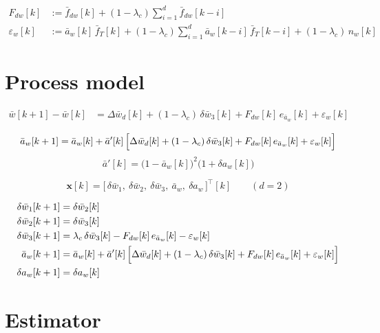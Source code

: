 \documentclass[11pt,a4paper,fontset=none]{ctexart}
\begin{document}
\begin{align*}
F_{dw}[k] &:= \bar{f}_{dw}[k] + (1-\lambda_c)\sum_{i=1}^{d}\bar{f}_{dw}[k-i] \\
\varepsilon_w[k] &:= \bar{a}_w[k]\,\bar{f}_T[k]
  + (1-\lambda_c)\sum_{i=1}^{d}\bar{a}_w[k-i]\,\bar{f}_T[k-i]
  + (1-\lambda_c)\,n_w[k]
\end{align*}

\section{Process model}

\begin{align*}
\bar{w}[k+1] - \bar{w}[k]
  &= \Delta\bar{w}_d[k] + (1-\lambda_c)\,\delta\bar{w}_3[k]
   + F_{dw}[k]\,e_{\bar{a}_w}[k] + \varepsilon_w[k]
\end{align*}

\begin{align*}
\bar{a}_w[k+1] = \bar{a}_w[k] + \bar{a}'[k]\,\Bigl[
  \Delta\bar{w}_d[k] + (1-\lambda_c)\,\delta\bar{w}_3[k]
  + F_{dw}[k]\,e_{\bar{a}_w}[k] + \varepsilon_w[k] \Bigr]
\end{align*}
\begin{equation*}
\bar{a}'[k] = \bigl(1-\bar{a}_w[k]\bigr)^{2}\bigl(1+\delta a_w[k]\bigr)
\end{equation*}

\begin{equation*}
\mathbf{x}[k] = \bigl[\,\delta\bar{w}_1,\ \delta\bar{w}_2,\ \delta\bar{w}_3,\
\bar{a}_w,\ \delta a_w\,\bigr]^{\top}[k] \qquad (d = 2)
\end{equation*}

\begin{align*}
\delta\bar{w}_1[k+1] &= \delta\bar{w}_2[k] \\
\delta\bar{w}_2[k+1] &= \delta\bar{w}_3[k] \\
\delta\bar{w}_3[k+1] &= \lambda_c\,\delta\bar{w}_3[k]
  - F_{dw}[k]\,e_{\bar{a}_w}[k] - \varepsilon_w[k] \\
\bar{a}_w[k+1] &= \bar{a}_w[k] + \bar{a}'[k]\,\Bigl[
  \Delta\bar{w}_d[k] + (1-\lambda_c)\,\delta\bar{w}_3[k]
  + F_{dw}[k]\,e_{\bar{a}_w}[k] + \varepsilon_w[k] \Bigr] \\
\delta a_w[k+1] &= \delta a_w[k]
\end{align*}

\section{Estimator}
\end{document}
